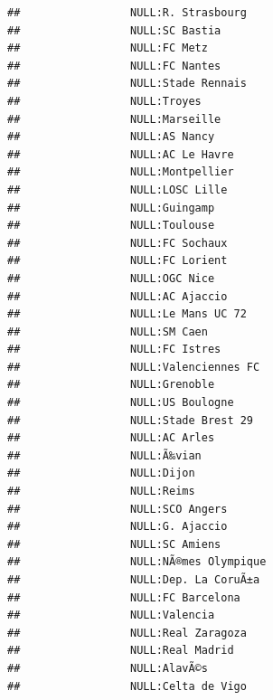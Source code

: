 \documentclass{article}\usepackage[]{graphicx}\usepackage[]{color}
\makeatletter
\newenvironment{kframe}{%
 \def\at@end@of@kframe{}%
 \ifinner\ifhmode%
  \def\at@end@of@kframe{\end{minipage}}%
  \begin{minipage}{\columnwidth}%
 \fi\fi%
 \def\FrameCommand##1{\hskip\@totalleftmargin \hskip-\fboxsep
 \colorbox{shadecolor}{##1}\hskip-\fboxsep
     \hskip-\linewidth \hskip-\@totalleftmargin \hskip\columnwidth}%
 \MakeFramed {\advance\hsize-\width
   \@totalleftmargin\z@ \linewidth\hsize
   \@setminipage}}%
 {\par\unskip\endMakeFramed%
 \at@end@of@kframe}
\newenvironment{knitrout}{}{} %
\makeatother
\begin{document}
\begin{knitrout}
\begin{kframe}
\begin{verbatim}
##                 NULL:R. Strasbourg                             
##                 NULL:SC Bastia                                 
##                 NULL:FC Metz                                   
##                 NULL:FC Nantes                                 
##                 NULL:Stade Rennais                             
##                 NULL:Troyes                                    
##                 NULL:Marseille                                 
##                 NULL:AS Nancy                                  
##                 NULL:AC Le Havre                               
##                 NULL:Montpellier                               
##                 NULL:LOSC Lille                                
##                 NULL:Guingamp                                  
##                 NULL:Toulouse                                  
##                 NULL:FC Sochaux                                
##                 NULL:FC Lorient                                
##                 NULL:OGC Nice                                  
##                 NULL:AC Ajaccio                                
##                 NULL:Le Mans UC 72                             
##                 NULL:SM Caen                                   
##                 NULL:FC Istres                                 
##                 NULL:Valenciennes FC                           
##                 NULL:Grenoble                                  
##                 NULL:US Boulogne                               
##                 NULL:Stade Brest 29                            
##                 NULL:AC Arles                                  
##                 NULL:Ã‰vian                                    
##                 NULL:Dijon                                     
##                 NULL:Reims                                     
##                 NULL:SCO Angers                                
##                 NULL:G. Ajaccio                                
##                 NULL:SC Amiens                                 
##                 NULL:NÃ®mes Olympique                          
##                 NULL:Dep. La CoruÃ±a                           
##                 NULL:FC Barcelona                              
##                 NULL:Valencia                                  
##                 NULL:Real Zaragoza                             
##                 NULL:Real Madrid                               
##                 NULL:AlavÃ©s                                   
##                 NULL:Celta de Vigo                             

\end{verbatim}
\end{kframe}
\end{knitrout}
\end{document}
